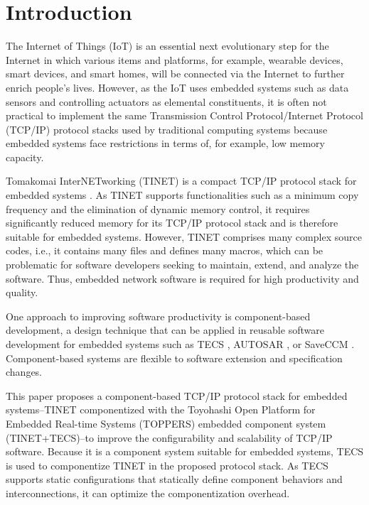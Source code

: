 \documentclass[conference]{IEEEtran/IEEEtran}
\begin{document}
\section{Introduction}
\label{sec:Introduction}

The Internet of Things (IoT) is an essential next evolutionary step for the Internet \cite{par:IoTIndustries} \cite{par:IoTComputing} in which various items and platforms, for example, wearable devices, smart devices, and smart homes, will be connected via the Internet to further enrich people's lives.
However, as the IoT uses embedded systems such as data sensors and controlling actuators as elemental constituents, it is often not practical to implement the same Transmission Control Protocol/Internet Protocol (TCP/IP) protocol stacks used by traditional computing systems because embedded systems face restrictions in terms of, for example, low memory capacity.

Tomakomai InterNETworking (TINET) is a compact TCP/IP protocol stack for embedded systems \cite{url:TINET}.
As TINET supports functionalities such as a minimum copy frequency and the elimination of dynamic memory control, it requires significantly reduced memory for its TCP/IP protocol stack and is therefore suitable for embedded systems.
However, TINET comprises many complex source codes, i.e., it contains many files and defines many macros, which can be problematic for software developers seeking to maintain, extend, and analyze the software.
Thus, embedded network software is required for high productivity and quality.

One approach to improving software productivity is component-based development, a design technique that can be applied in reusable software development for embedded systems \cite{par:Crnkovic}\cite{par:CBD} such as TECS \cite{par:TECS} \cite{par:hr-tecs}, AUTOSAR \cite{url:AUTOSAR}, or SaveCCM \cite{par:SAVEapproach}.
Component-based systems are flexible to software extension and specification changes.

This paper proposes a component-based TCP/IP protocol stack for embedded systems--TINET componentized with the Toyohashi Open Platform for Embedded Real-time Systems (TOPPERS) embedded component system (TINET+TECS)--to improve the configurability and scalability of TCP/IP software.
Because it is a component system suitable for embedded systems, TECS \cite{par:TECS} \cite{par:hr-tecs} is used to componentize TINET in the proposed protocol stack.
As TECS supports static configurations that statically define component behaviors and interconnections, it can optimize the componentization overhead.
\end{document}
